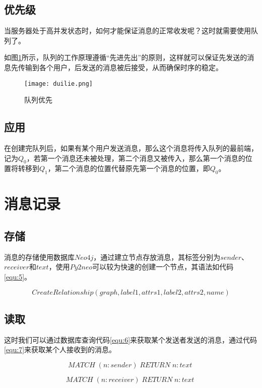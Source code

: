 \documentclass[forprint]{OSPaper}
\begin{document}
\subsection{优先级}
当服务器处于高并发状态时，如何才能保证消息的正常收发呢？这时就需要使用队列了。

如图\ref{fig:12}所示，队列的工作原理遵循“先进先出”的原则，这样就可以保证先发送的消息先传输到各个用户，后发送的消息被后接受，从而确保时序的稳定。


\begin{figure}[ht]
	\centering
	\texttt{[image: duilie.png]}
	\caption{队列优先}
	\label{fig:12}
\end{figure}
\subsection{应用}
在创建完队列后，如果有某个用户发送消息，那么这个消息将传入队列的最前端，记为$Q_0$，若第一个消息还未被处理，第二个消息又被传入，那么第一个消息的位置将转移到$Q_1$，第二个消息的位置代替原先第一个消息的位置，即$Q_0$。

\section{消息记录}

\subsection{存储}

消息的存储使用数据库$Neo4j$，通过建立节点存放消息，其标签分别为$sender$、$receiver$和$text$，使用$Py2neo$可以较为快速的创建一个节点，其语法如代码\ref{equ:5}。

\begin{equation}
	\label{equ:5}
	CreateRelationship(graph, label1, attrs1, label2, attrs2, name)
\end{equation}

\subsection{读取}
这时我们可以通过数据库查询代码\ref{equ:6}来获取某个发送者发送的消息，通过代码\ref{equ:7}来获取某个人接收到的消息。

\begin{equation}
	\label{equ:6}
	MATCH \; (n:sender) \; RETURN \; n:text \;
\end{equation}

\begin{equation}
		\label{equ:7}
	MATCH \; (n:receiver) \; RETURN \; n:text \;
\end{equation}
\end{document}
